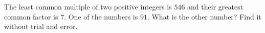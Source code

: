 The least common multiple of two positive integers is $546$ and their greatest common factor is $7$. One of the numbers is $91$. What is the other number? Find it without trial and error.
